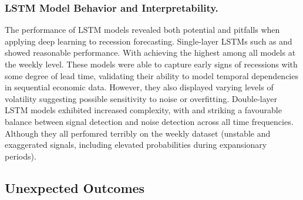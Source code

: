 \subsubsection{LSTM Model Behavior and Interpretability.}
The performance of LSTM models revealed both potential and pitfalls when applying deep learning to recession forecasting. 
Single-layer LSTMs such as \LSTMF and \LSTME showed reasonable performance. 
With \LSTME achieving the highest \AUCtwo among all models at the weekly level. These models were able to capture early signs of recessions with some degree of lead time, validating their ability to model temporal dependencies in sequential economic data. However, they also displayed varying levels of volatility 
suggesting possible sensitivity to noise or overfitting.
Double-layer LSTM models exhibited increased complexity, with \LSTMFF and \LSTMEE striking a favourable balance between signal detection and noise detection across all time frequencies. Although they all perfomred terribly on the weekly dataset (unstable and exaggerated signals, including elevated probabilities during expansionary periods). 

\subsection{Unexpected Outcomes}

